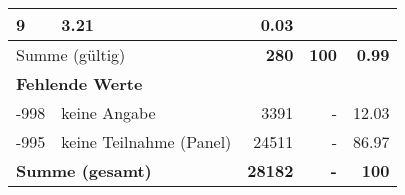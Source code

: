 \begin{longtable}{lXrrr}
       \num{9} &
       \num[round-mode=places,round-precision=2]{3.21} &
         \num[round-mode=places,round-precision=2]{0.03} \\
     \midrule
     \multicolumn{2}{l}{Summe (gültig)} &
       \textbf{\num{280}} &
     \textbf{\num{100}} &
       \textbf{\num[round-mode=places,round-precision=2]{0.99}} \\
     \multicolumn{5}{l}{\textbf{Fehlende Werte}}\\
       -998 &
       keine Angabe &
         \num{3391} &
        - &
         \num[round-mode=places,round-precision=2]{12.03} \\
       -995 &
       keine Teilnahme (Panel) &
         \num{24511} &
        - &
         \num[round-mode=places,round-precision=2]{86.97} \\
     \midrule
     \multicolumn{2}{l}{\textbf{Summe (gesamt)}} &
          \textbf{\num{28182}} &
        \textbf{-} &
        \textbf{\num{100}} \\
     \bottomrule
     \end{longtable}
     
